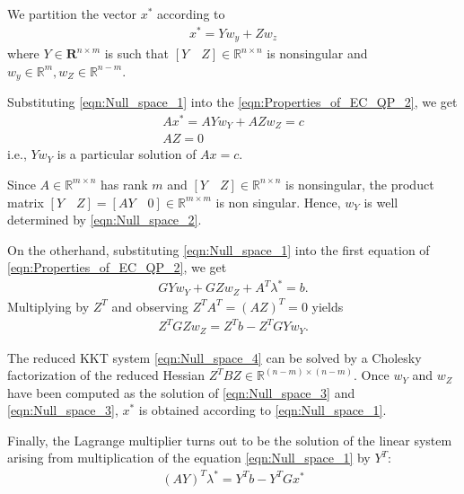 We partition the vector $x^*$ according to
\begin{equation}
	\begin{aligned}
		x^* = Yw_y + Zw_z
	\end{aligned}
	\label{eqn:Null_space_1}
\end{equation}
where $Y\in \mathbf{R}^{n\times m}$ is such that $[Y\quad Z]\in \mathbb{R}^{n\times n}$ is nonsingular and $w_y \in \mathbb{R}^m,w_Z \in \mathbb{R}^{n-m}$.

Substituting \ref{eqn:Null_space_1} into the \ref{eqn:Properties_of_EC_QP_2}, we get
\begin{equation}
	\begin{aligned}
		Ax^* = AYw_Y + AZw_Z = c\\
		AZ=0
	\end{aligned}
	\label{eqn:Null_space_2}
\end{equation}
i.e., $Yw_Y$ is a particular solution of $Ax=c$.

Since $A\in \mathbb{R}^{m\times n}$ has rank $m$ and $[Y \quad Z]\in \mathbb{R}^{n\times n}$ is nonsingular, the product matrix $[Y \quad Z] = [AY \quad 0]\in \mathbb{R}^{m\times m}$ is non singular. Hence, $w_Y$ is well determined by \ref{eqn:Null_space_2}.

On the otherhand, substituting \ref{eqn:Null_space_1} into the first equation of \ref{eqn:Properties_of_EC_QP_2}, we get
\begin{equation}
	\begin{aligned}
		GYw_Y + GZw_Z + A^T\lambda^* = b.
	\end{aligned}
	\label{eqn:Null_space_3}
\end{equation}
Multiplying by $Z^T$ and observing $Z^{T}A^{T}=(AZ)^T=0$ yields
\begin{equation}
	\begin{aligned}
		Z^TGZw_Z = Z^Tb - Z^TGY w_Y.
	\end{aligned}
	\label{eqn:Null_space_4}
\end{equation}

The reduced KKT system \ref{eqn:Null_space_4} can be solved by a Cholesky factorization of the reduced Hessian $Z^TBZ\in \mathbb{R}^{(n-m)\times(n-m)}$. Once $w_Y$ and $w_Z$ have been computed as the solution of \ref{eqn:Null_space_3} and \ref{eqn:Null_space_3}, $x^*$ is obtained according to \ref{eqn:Null_space_1}.

Finally, the Lagrange multiplier turns out to be the solution of the linear system arising from multiplication of the equation \ref{eqn:Null_space_1} by $Y^T$:
\begin{equation}
	\begin{aligned}
		(AY)^T\lambda^* = Y^Tb - Y^TGx^*
	\end{aligned}
\end{equation} 


